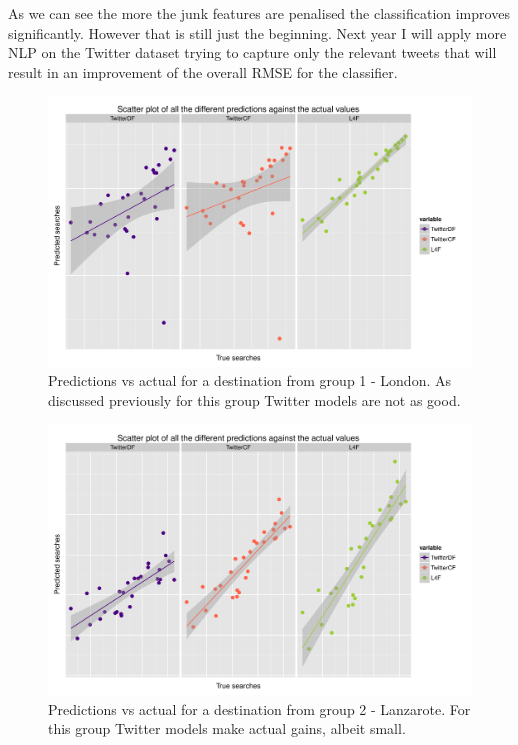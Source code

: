 \documentclass[minf,frontabs,twoside,singlespacing,parskip]{infthesis}
\begin{document}
As we can see the more the junk features are penalised the classification improves significantly. However that is still just the beginning. Next year I will apply more NLP on the Twitter dataset trying to capture only the relevant tweets that will result in an improvement of the overall RMSE for the classifier. 

\begin{figure}[h!]
\begin{center}
\includegraphics[scale=0.5]{plots/London}
\end{center}
\caption{Predictions vs actual for a destination from group 1 - London. As discussed previously for this group Twitter models are not as good.}
\end{figure}

\begin{figure}[h!]
\begin{center}
\includegraphics[scale=0.5]{plots/lanzarote}
\end{center}
\caption{Predictions vs actual for a destination from group 2 - Lanzarote. For this group Twitter models make actual gains, albeit small.}
\end{figure}
\end{document}
